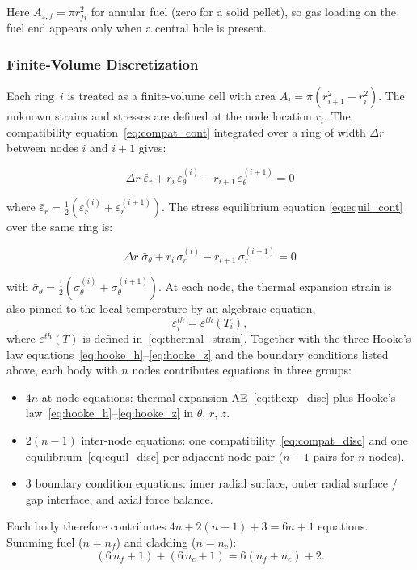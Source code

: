 \begin{refsection}
Here $A_{z,f} = \pi r_{fi}^2$ for annular fuel (zero for a solid pellet), so gas loading on the fuel end appears only when a central hole is present.
\label{eq:axial_balance}

\subsubsection{Finite-Volume Discretization}

Each ring~$i$ is treated as a finite-volume cell with area $A_i = \pi(r_{i+1}^2 - r_i^2)$.  The unknown strains and stresses are defined at the node location $r_i$.  The compatibility equation~\eqref{eq:compat_cont} integrated over a ring of width $\Delta r$ between nodes $i$ and $i+1$ gives:

\begin{equation}
  \Delta r\;\bar{\varepsilon}_r + r_i\,\varepsilon_\theta^{(i)}
  - r_{i+1}\,\varepsilon_\theta^{(i+1)} = 0
  \label{eq:compat_disc}
\end{equation}

where $\bar{\varepsilon}_r = \tfrac{1}{2}(\varepsilon_r^{(i)} + \varepsilon_r^{(i+1)})$.  The stress equilibrium equation \eqref{eq:equil_cont} over the same ring is:

\begin{equation}
  \Delta r\;\bar{\sigma}_\theta + r_i\,\sigma_r^{(i)}
  - r_{i+1}\,\sigma_r^{(i+1)} = 0
  \label{eq:equil_disc}
\end{equation}

with $\bar{\sigma}_\theta = \tfrac{1}{2}(\sigma_\theta^{(i)} + \sigma_\theta^{(i+1)})$.  At each node, the thermal expansion strain is also pinned to the local temperature by an algebraic equation,
\begin{equation}
  \varepsilon^{th}_i = \varepsilon^{th}(T_i),
  \label{eq:thexp_disc}
\end{equation}
where $\varepsilon^{th}(T)$ is defined in~\eqref{eq:thermal_strain}.  Together with the three Hooke's law equations~\eqref{eq:hooke_h}--\eqref{eq:hooke_z} and the boundary conditions listed above, each body with $n$ nodes contributes equations in three groups:
\begin{itemize}
\item $4n$ at-node equations: thermal expansion AE~\eqref{eq:thexp_disc} plus Hooke's law~\eqref{eq:hooke_h}--\eqref{eq:hooke_z} in $\theta$, $r$, $z$.
\item $2(n-1)$ inter-node equations: one compatibility~\eqref{eq:compat_disc} and one equilibrium~\eqref{eq:equil_disc} per adjacent node pair ($n-1$ pairs for $n$ nodes).
\item 3 boundary condition equations: inner radial surface, outer radial surface / gap interface, and axial force balance.
\end{itemize}
Each body therefore contributes $4n + 2(n-1) + 3 = 6n + 1$ equations. Summing fuel ($n = n_f$) and cladding ($n = n_c$):
\begin{equation}
  (6\,n_f + 1) + (6\,n_c + 1) = 6(n_f + n_c) + 2.
  \label{eq:mech_neq}
\end{equation}


\end{refsection}
